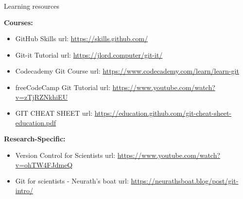 \documentclass[aspectratio=1609]{beamer}
\begin{document}
\begin{frame}{Learning resources}
    \small
        \begin{texample}{\textbf{Courses:}}
        \begin{itemize}
            \item GitHub Skills  url: \url{https://skills.github.com/}
            \item Git-it Tutorial  url: \url{https://jlord.computer/git-it/}
            \item Codecademy Git Course  url: \url{https://www.codecademy.com/learn/learn-git}
            \item freeCodeCamp Git Tutorial  url: \url{https://www.youtube.com/watch?v=zTjRZNkhiEU}
            \item GIT CHEAT SHEET url: \url{https://education.github.com/git-cheat-sheet-education.pdf}
        \end{itemize}
    \end{texample}
        \begin{talert}{\textbf{Research-Specific:}}
        \begin{itemize}
            \item Version Control for Scientists url: \url{https://www.youtube.com/watch?v=ohTW4FJdmeQ}
            \item Git for scientists - Neurath's boat url: \url{https://neurathsboat.blog/post/git-intro/}
        \end{itemize}
    \end{talert}
\end{frame}
\end{document}
